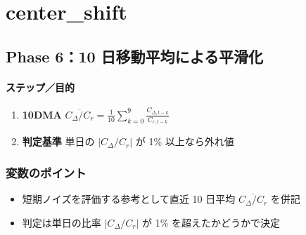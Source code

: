 
\section*{center\_shift}\nopagebreak[4]

\subsection*{Phase 6：10 日移動平均による平滑化}\nopagebreak[4]
\paragraph{ステップ／目的}
\begin{flushleft}
\begin{enumerate}
  \item \textbf{10DMA}\; \( \overline{C_{\Delta}/C_r} = \frac{1}{10}\sum_{k=0}^{9} \frac{C_{\Delta,t-k}}{C_{r,t-k}} \)
  \item \textbf{判定基準}\; 単日の \(\left|C_{\Delta}/C_r\right|\) が 1\% 以上なら外れ値
  \end{enumerate}
\end{flushleft}

\subsubsection*{変数のポイント}
\begin{flushleft}
\begin{itemize}
  \item 短期ノイズを評価する参考として直近 10 日平均 \(\overline{C_{\Delta}/C_r}\) を併記
  \item 判定は単日の比率 \(\left|C_{\Delta}/C_r\right|\) が 1\% を超えたかどうかで決定
\end{itemize}
\end{flushleft}

